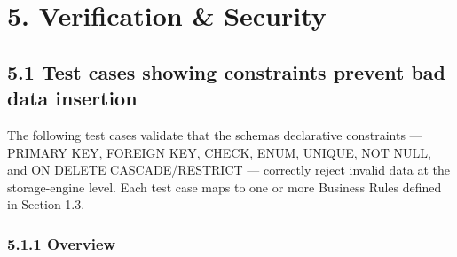 \section*{5. Verification \& Security}

\subsection*{5.1 Test cases showing constraints prevent bad data insertion}

The following test cases validate that the schema\textquotesingle s declarative constraints --- PRIMARY KEY, FOREIGN KEY, CHECK, ENUM, UNIQUE, NOT NULL, and ON DELETE CASCADE/RESTRICT --- correctly reject invalid data at the storage-engine level. Each test case maps to one or more Business Rules defined in Section 1.3.

\subsubsection*{5.1.1 Overview}

